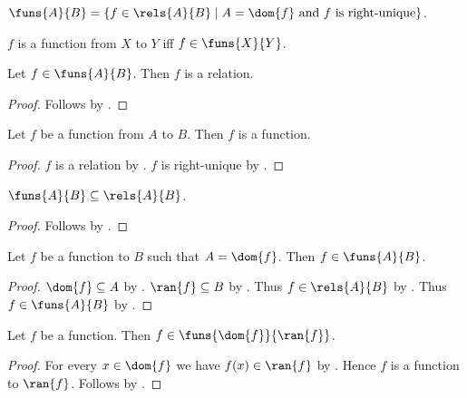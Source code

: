 \begin{definition}\label{funs}
    $\funs{A}{B} = \{ f\in\rels{A}{B}\mid \text{$A= \dom{f}$ and $f$ is right-unique}\}$.
\end{definition}

\begin{abbreviation}\label{function_from_to}
    $f$ is a function from $X$ to $Y$ iff $f\in\funs{X}{Y}$.
\end{abbreviation}

\begin{proposition}\label{funs_is_relation}
    Let $f\in\funs{A}{B}$.
    Then $f$ is a relation.
\end{proposition}
\begin{proof}
    Follows by .
\end{proof}

\begin{classification}\label{funs_is_function}
    Let $f$ be a function from $A$ to $B$.
    Then $f$ is a function.
\end{classification}
\begin{proof}
    $f$ is a relation by .
    $f$ is right-unique by .
\end{proof}

\begin{proposition}\label{funs_subseteq_rels}
    $\funs{A}{B}\subseteq\rels{A}{B}$.
\end{proposition}
\begin{proof}
    Follows by .
\end{proof}

\begin{proposition}\label{funs_intro}
    Let $f$ be a function to $B$ such that $A=\dom{f}$.
    Then $f\in\funs{A}{B}$.
\end{proposition}
\begin{proof}
    $\dom{f}\subseteq A$ by .
    $\ran{f}\subseteq B$ by .
    Thus $f\in\rels{A}{B}$ by .
    Thus $f\in\funs{A}{B}$ by .
\end{proof}

\begin{proposition}\label{function_exact_type_to_range}
    Let $f$ be a function.
    Then $f\in\funs{\dom{f}}{\ran{f}}$.
\end{proposition}
\begin{proof}
    For every $x\in\dom{f}$ we have $f(x)\in\ran{f}$ by
        .
    Hence $f$ is a function to $\ran{f}$.
    Follows by .
\end{proof}

